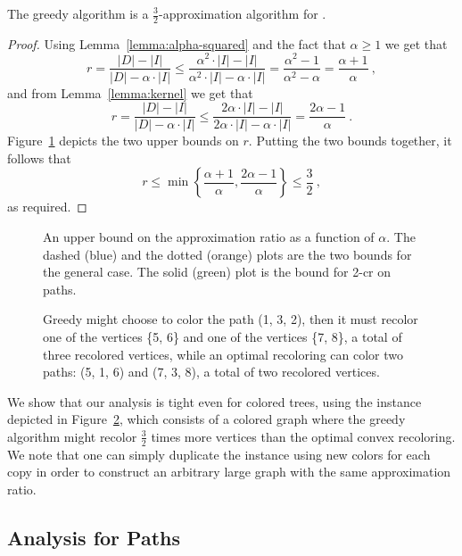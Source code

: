 \begin{theorem}
The greedy algorithm is a $\frac{3}{2}$-approximation algorithm for
\TWOCR{}.
\end{theorem}
\begin{proof}
Using Lemma~\ref{lemma:alpha-squared} and the fact that $\alpha \geq 1$ we get
that
$$
r
=    \frac{|D| - |I|}{|D| - \alpha \cdot |I|}
\leq \frac{\alpha ^ 2 \cdot |I| - |I|}{\alpha ^ 2 \cdot |I| - \alpha \cdot |I|}
=    \frac{\alpha ^ 2 - 1}{\alpha ^ 2 - \alpha}
=    \frac{\alpha+1}{\alpha}
~, 
$$
and from Lemma~\ref{lemma:kernel} we get that
$$
r
=    \frac{|D| - |I|}{|D| - \alpha \cdot |I|}
\leq \frac{2 \alpha \cdot |I| - |I|}{2 \alpha \cdot |I| - \alpha \cdot |I|}
=    \frac{2 \alpha - 1}{\alpha}
~.
$$
Figure~\ref{fig:upper_bound} depicts the two upper bounds on $r$.
Putting the two bounds together, it follows that
\[
r
\leq \min \left\{\frac{\alpha+1}{\alpha} , \frac{2\alpha-1}{\alpha} \right\}
\leq    \frac{3}{2}
~,
\]
as required.
\end{proof}



\begin{figure}
\centering

\caption{
\label{fig:upper_bound}
An upper bound on the approximation ratio as a function of $\alpha$.
The dashed (blue) and the dotted (orange) plots are the two bounds for the general case.
The solid (green) plot is the bound for 2-cr on paths.
}
\end{figure}

\begin{figure}
\centering

\caption{
Greedy might choose to color the path (1, 3, 2), 
then it must recolor one of the vertices \{5, 6\} 
and one of the vertices \{7, 8\}, 
a total of three recolored vertices, 
while an optimal recoloring can color two paths: (5, 1, 6) and (7, 3, 8), 
a total of two recolored vertices.}
\label{fig:tight}
\end{figure}

We show that our analysis is tight even for colored trees, using the
instance depicted in Figure~\ref{fig:tight}, 
which consists of a colored graph where the greedy algorithm might recolor
$\frac{3}{2}$ times more vertices than the optimal convex recoloring.
%
We note that one can simply duplicate the instance using new colors for
each copy in order to construct an arbitrary large graph with the same
approximation ratio.


\subsection{Analysis for Paths}

